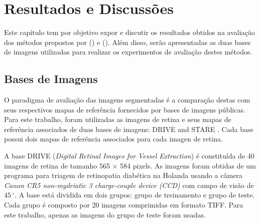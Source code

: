
\chapter{Resultados e Discuss\~{o}es}
\thispagestyle{empty}

Este cap\'{i}tulo tem por objetivo expor e discutir os resultados obtidos na avalia\c{c}\~{a}o dos m\'{e}todos propostos por \citeauthor{Soares:2006} (\citeyear{Soares:2006}) e \citeauthor{Zana:2001} (\citeyear{Zana:2001}). Al\'{e}m disso, ser\~{a}o apresentadas as duas bases de imagens utilizadas para realizar os experimentos de avalia\c{c}\~{a}o destes m\'{e}todos.

\section{Bases de Imagens}

O paradigma de avalia\c{c}\~{a}o das imagens segmentadas \'{e} a compara\c{c}\~{a}o destas com seus respectivos mapas de refer\^{e}ncia fornecidos por bases de imagens p\'{u}blicas. Para este trabalho, foram utilizadas as imagens de retina e seus mapas de refer\^{e}ncia associados de duas bases de imagens: DRIVE \cite{Niemeijer:2004} and STARE \cite{Hoover:2000}. Cada base possui dois mapas de refer\^{e}ncia associados para cada imagen de retina.

A base DRIVE (\textit{Digital Retinal Images for Vessel Extraction}) \'{e} constitu\'{i}da de 40 imagens de retina de tamanho 565 $\times$ 584 pixels. As imagens foram obtidas de um programa para triagem de retinopatia diab\'{e}tica na Holanda usando a c\^{a}mera \textit{Canon CR5 non-mydriatic 3 charge-couple device (CCD)}  com campo de vis\~{a}o de $45\,^{\circ}$. A base est\'{a} dividida em dois grupos: grupo de treinamento e grupo de teste. Cada grupo \'{e} composto por 20 imagens comprimidas em formato TIFF. Para este trabalho, apenas as imagens do grupo de teste foram usadas.

